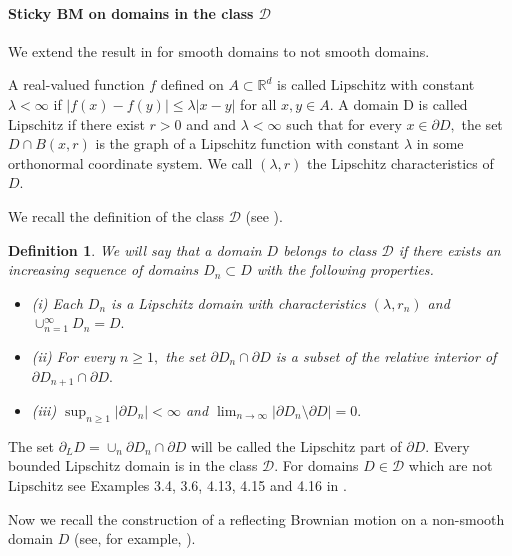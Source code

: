 \documentclass[[11pt,a4paper,reqno]{article}
\newcommand{\R}{{\mathbb R}}
\newtheorem{definition}{Definition}
\numberwithin{equation}{section}
\begin{document}
\paragraph{Sticky BM on domains in the class $\mathcal{D}$}

We extend the result in \cite{DovSticky2} for smooth domains to  not smooth domains.








 
A real-valued function $f$ defined on $A \subset  \R^d$ is called Lipschitz with constant $\lambda < \infty $ if
$|f(x)- f(y)| \leqslant  \lambda |x - y|$ for all $x, y \in A.$  A domain D is called Lipschitz if there exist $r > 0$ and and $\lambda  < \infty$ such that for every $x \in  \partial D,$ the set $D \cap  B(x, r)$ is the graph of a Lipschitz
function with constant $\lambda$ in some orthonormal coordinate system. We call $(\lambda , r)$ the Lipschitz
characteristics of $D.$ 

We recall  the definition of the class $\mathcal{D}$  (see  \cite{BBC}).

\begin{definition}
We will say that a domain $D$ belongs to class $\mathcal{D}$ if there exists an increasing
sequence of domains $D_n \subset D$ with the following properties.\begin{itemize}
\item (i) Each $D_n$ is a Lipschitz domain with characteristics $(\lambda, r_n)$ and $\cup_{n=1}^\infty D_n = D.$
\item (ii) For every $n\geq 1,$ the set $\partial D_n \cap  \partial D$ is a subset of the relative interior of $\partial D_{n+1} \cap  \partial D.$
\item (iii) $\sup_{n\geqslant 1} |\partial D_n| < \infty$  and $\lim_{n\to\infty} |\partial D_n \setminus  \partial D| = 0.$
\end{itemize}
\end{definition}

The set $\partial_L D = \cup_n \partial D_n \cap \partial D$ will be called the Lipschitz part of $\partial D.$
Every bounded Lipschitz domain is in the class  $\mathcal{D}$.
For domains $D\in   \mathcal{D}$ which are not Lipschitz see Examples 3.4, 3.6, 4.13, 4.15 and 4.16 in \cite{BBC}.


Now we recall the construction of a reflecting Brownian motion on a non-smooth domain $D$ (see, for example, \cite{BBC}).
\end{document}
